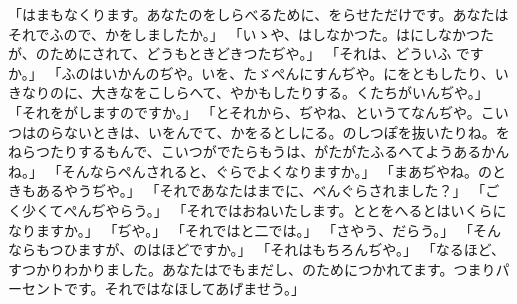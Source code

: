 \documentclass[a4paper,
tate,
book]
{jlreq}
\begin{document}
「はまもなくります。あなたのをしらべるために、をらせただけです。あなたはそれでふので、かをしましたか。」
「いゝや、はしなかつた。はにしなかつたが、のためにされて、どうもときどきつたぢや。」
「それは、どういふ
ですか。」
「ふのはいかんのぢや。いを、たゞぺんにすんぢや。にをともしたり、いきなりのに、大きなをこしらへて、やかもしたりする。くたちがいんぢや。」
「それをがしますのですか。」
「とそれから、ぢやね、というてなんぢや。こいつはのらないときは、いをんでて、かをるとしにる。のしつぽを抜いたりね。をねらつたりするもんで、こいつがでたらもうは、がたがたふるへてようあるかんね。」
「そんならペんされると、ぐらでよくなりますか。」
「まあぢやね。のときもあるやうぢや。」
「それであなたはまでに、べんぐらされました？」
「ごく少くてぺんぢやらう。」
「それではおねいたします。ととをへるとはいくらになりますか。」
「ぢや。」
「それではと二では。」
「さやう、だらう。」
「そんならもつひますが、のはほどですか。」
「それはもちろんぢや。」
「なるほど、すつかりわかりました。あなたはでもまだし、のためにつかれてます。つまりパーセントです。それではなほしてあげませう。」
\end{document}
